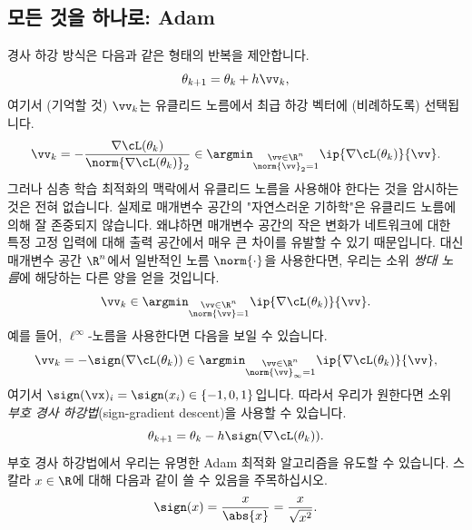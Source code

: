 \documentclass[../../book-main_ko.tex]{subfiles}
\begin{document}
\subsection{모든 것을 하나로: Adam}

경사 하강 방식은 다음과 같은 형태의 반복을 제안합니다.
\begin{equation}
    \theta_{k + 1} = \theta_{k} + h\vv_{k},
\end{equation}
여기서 (기억할 것) \(\vv_{k}\)는 유클리드 노름에서 최급 하강 벡터에 (비례하도록) 선택됩니다.
\begin{equation}
    \vv_{k} = -\frac{\nabla \cL(\theta_{k})}{\norm{\nabla \cL(\theta_{k})}_{2}} \in \argmin_{\substack{\vv \in \R^{n} \\ \norm{\vv}_{2} = 1}}\ip{\nabla \cL(\theta_{k})}{\vv}.
\end{equation}
그러나 심층 학습 최적화의 맥락에서 유클리드 노름을 사용해야 한다는 것을 암시하는 것은 전혀 없습니다. 실제로 매개변수 공간의 "자연스러운 기하학"은 유클리드 노름에 의해 잘 존중되지 않습니다. 왜냐하면 매개변수 공간의 작은 변화가 네트워크에 대한 특정 고정 입력에 대해 출력 공간에서 매우 큰 차이를 유발할 수 있기 때문입니다. 대신 매개변수 공간 \(\R^{n}\)에서 일반적인 노름 \(\norm{\cdot}\)을 사용한다면, 우리는 소위 \textit{쌍대 노름}에 해당하는 다른 양을 얻을 것입니다.
\begin{equation}
    \vv_{k} \in \argmin_{\substack{\vv \in \R^{n} \\ \norm{\vv} = 1}}\ip{\nabla \cL(\theta_{k})}{\vv}.
\end{equation}
예를 들어, \(\ell^{\infty}\)-노름을 사용한다면 다음을 보일 수 있습니다.
\begin{equation}
    \vv_{k} = -\sign(\nabla \cL(\theta_{k})) \in \argmin_{\substack{\vv \in \R^{n} \\ \norm{\vv}_{\infty} = 1}}\ip{\nabla \cL(\theta_{k})}{\vv},
\end{equation}
여기서 \(\sign(\vx)_{i} = \sign(x_{i}) \in \{-1, 0, 1\}\)입니다. 따라서 우리가 원한다면 소위 \textit{부호 경사 하강법}(sign-gradient descent)을 사용할 수 있습니다.
\begin{equation}\label{eq:sign_gradient_descent}
    \theta_{k + 1} = \theta_{k} - h\sign(\nabla \cL(\theta_{k})).
\end{equation}
부호 경사 하강법에서 우리는 유명한 Adam 최적화 알고리즘을 유도할 수 있습니다. 스칼라 \(x \in \R\)에 대해 다음과 같이 쓸 수 있음을 주목하십시오.
\begin{equation}
    \sign(x) = \frac{x}{\abs{x}} = \frac{x}{\sqrt{x^{2}}}.
\end{equation}
\end{document}
